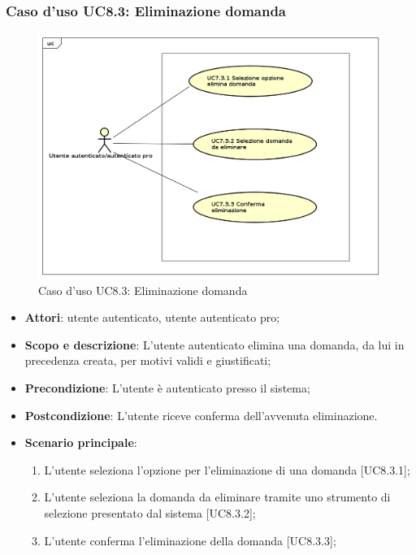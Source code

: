 	\subsubsection{Caso d'uso UC8.3: Eliminazione domanda}	
	\label{UC8.3}
	\begin{figure}[h]
		\centering
			\includegraphics[scale=0.45,keepaspectratio]{UML/UC8_3.png}
		\caption{Caso d'uso UC8.3: Eliminazione domanda}
	\end{figure}
	\FloatBarrier
	\begin{itemize}
		\item
			\textbf{Attori}: utente autenticato, utente autenticato pro;
		\item		
			\textbf{Scopo e descrizione}: L'utente autenticato elimina una domanda, da lui in precedenza creata, per motivi validi e giustificati;
		\item
			\textbf{Precondizione}: L'utente è autenticato presso il sistema;
		\item
			\textbf{	Postcondizione}: L'utente riceve conferma dell'avvenuta eliminazione.
		\item
			\textbf{Scenario principale}:
	       		\begin{enumerate}
					\item 	
					L'utente seleziona l'opzione per l'eliminazione di una domanda [UC8.3.1];
					\item
					L'utente seleziona la domanda da eliminare tramite uno strumento di selezione presentato dal sistema [UC8.3.2];
					\item
					L'utente conferma l'eliminazione della domanda [UC8.3.3];
	 			\end{enumerate}
	\end{itemize}
